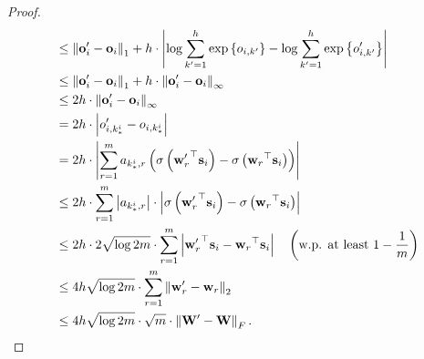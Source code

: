 \documentclass[10pt]{article}
\def\rvo{{\mathbf{o}}}
\def\rvs{{\mathbf{s}}}
\def\rvw{{\mathbf{w}}}
\def\rvo{{\mathbf{o}}}
\def\rmW{{\mathbf{W}}}
\begin{document}
\begin{proof}
\begin{equation*}
\begin{split}
    &\le \left\| \rvo_i^\prime - \rvo_i \right\|_1 + h \cdot \left| \log{ \sum\limits_{k^\prime=1}^{h}{ \exp\left\{ o_{i,k^\prime} \right\} } } - \log{ \sum\limits_{k^\prime=1}^{h}{ \exp\left\{ o_{i,k^\prime}^\prime \right\} } } \right| \\
    &\le \left\| \rvo_i^\prime - \rvo_i \right\|_1 + h \cdot \left\| \rvo_i^\prime - \rvo_i \right\|_\infty \\
    &\le 2 h \cdot \left\| \rvo_i^\prime - \rvo_i \right\|_\infty \\
    &= 2 h \cdot \left| o_{i,k_*^i}^\prime - o_{i,k_*^i} \right| \\
    &= 2 h \cdot \left| \sum\limits_{r=1}^{m}{a_{k_*^i,r} \left( \sigma\left({\rvw_r^\prime}^\top \rvs_i\right) - \sigma\left({\rvw_r}^\top \rvs_i\right) \right) } \right| \\
    &\le 2 h \cdot \sum\limits_{r=1}^{m}{ \left| a_{k_*^i,r} \right| \cdot \left| \sigma\left({\rvw_r^\prime}^\top \rvs_i\right) - \sigma\left({\rvw_r}^\top \rvs_i\right) \right| } \\
    &\le 2 h \cdot 2 \sqrt{\log{2m}} \cdot \sum\limits_{r=1}^{m}{ \left| {\rvw_r^\prime}^\top \rvs_i - {\rvw_r}^\top \rvs_i \right| } \quad \left( \text{w.p. at least } 1 - \frac{1}{m} \right) \\
    &\le 4h \sqrt{\log{2m}} \cdot \sum\limits_{r=1}^{m}{ \left\| \rvw_r^\prime - \rvw_r \right\|_2 } \\
    &\le 4h \sqrt{\log{2m}} \cdot \sqrt{m} \cdot \left\| \rmW^\prime - \rmW \right\|_F. \qedhere
\end{split}
\end{equation*}
\end{proof}
\end{document}
